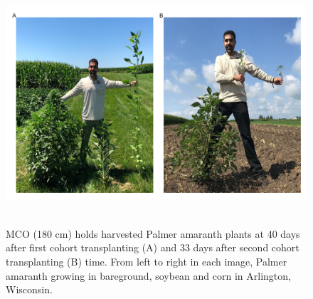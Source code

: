 \documentclass[utf8]{frontiersSCNS}
\begin{document}
\begin{figure}

{\centering \includegraphics[width=150mm,height=90mm]{../data analysis/figures/Figure 6} 

}

\caption{MCO (180 cm) holds harvested Palmer amaranth plants at 40 days after first cohort transplanting (A) and 33 days after second cohort transplanting (B) time. From left to right in each image, Palmer amaranth growing in bareground, soybean and corn in Arlington, Wisconsin.}\label{fig:Figure-6}
\end{figure}
\end{document}
